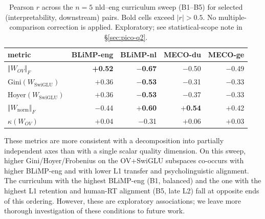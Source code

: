 \begin{table}[h]
  \centering
  \small
  \caption{Pearson $r$ across the $n=5$ nld--eng curriculum sweep (B1--B5) for selected (interpretability, downstream) pairs. Bold cells exceed $|r|>0.5$. No multiple-comparison correction is applied. Exploratory; see statistical-scope note in \S\ref{sec:pico-q2}.}
  \label{tab:pico-q2-headline}
  \begin{tabular}{lrrrr}
    \toprule
    metric & BLiMP-eng & BLiMP-nl & MECO-du & MECO-ge \\
    \midrule
    $\Vert W_{OV}\Vert_F$       & \textbf{+0.52} & \textbf{$-$0.67} & $-$0.50 & $-$0.49 \\
    Gini$(W_{\text{SwiGLU}})$   & $+$0.36        & \textbf{$-$0.53} & $-$0.31 & $-$0.33 \\
    Hoyer$(W_{\text{SwiGLU}})$  & $+$0.36        & \textbf{$-$0.53} & $-$0.37 & $-$0.33 \\
    $\Vert W_{\text{norm}}\Vert_F$ & $-$0.44     & \textbf{$+$0.60} & \textbf{$+$0.54} & $+$0.42 \\
    $\kappa(W_{OV})$            & $+$0.04        & $-$0.31          & $+$0.06 & $+$0.03 \\
    \bottomrule
  \end{tabular}
\end{table}

These metrics are more consistent with a decomposition into partially independent axes than with a single scalar quality dimension. On this sweep, higher Gini/Hoyer/Frobenius on the OV+SwiGLU subspaces co-occurs with higher BLiMP-eng and with lower L1 transfer and psycholinguistic alignment. The curriculum with the highest BLiMP-eng (B1, balanced) and the one with the highest L1 retention and human-RT alignment (B5, late L2) fall at opposite ends of this ordering. However, these are exploratory associations; we leave more thorough investigation of these conditions to future work. 



